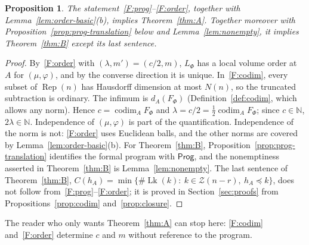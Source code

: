 \documentclass[11pt,a4paper]{article}
\newtheorem{proposition}[theorem]{Proposition}
\theoremstyle{definition}
\theoremstyle{remark}
\numberwithin{equation}{section}
\newcommand{\N}{\mathbb{N}}
\newcommand{\Rep}{\operatorname{Rep}}
\newcommand{\codim}{\operatorname{codim}}
\newcommand{\Zb}{\mathcal Z}
\newcommand{\Prog}{\mathsf{Prog}}
\newcommand{\Lk}{\operatorname{Lk}}
\begin{document}
\begin{proposition}\label{prop:formal-implies}
The statement~\ref{F:prog}--\ref{F:order}, together with Lemma~\ref{lem:order-basic}(b), implies Theorem~\ref{thm:A}. Together moreover with Proposition~\ref{prop:prog-translation} below and Lemma~\ref{lem:nonempty}, it implies Theorem~\ref{thm:B} except its last sentence.
\end{proposition}
\begin{proof}
By~\ref{F:order} with $(\lambda,m')=(c/2,m)$, $L_\Phi$ has a local volume order at $A$ for $(\mu,\varphi)$, and by the converse direction it is unique. In~\ref{F:codim}, every subset of $\Rep(n)$ has Hausdorff dimension at most $N(n)$, so the truncated subtraction is ordinary. The infimum is $d_A(F_\Phi)$ (Definition~\ref{def:codim}, which allows any norm). Hence $c=\codim_AF_\Phi$ and $\lambda=c/2=\frac{1}{2}\codim_AF_\Phi$; since $c\in\N$, $2\lambda\in\N$. Independence of $(\mu,\varphi)$ is part of the quantification. Independence of the norm is not: \ref{F:order} uses Euclidean balls, and the other norms are covered by Lemma~\ref{lem:order-basic}(b). For Theorem~\ref{thm:B}, Proposition~\ref{prop:prog-translation} identifies the formal program with $\Prog$, and the nonemptiness asserted in Theorem~\ref{thm:B} is Lemma~\ref{lem:nonempty}. The last sentence of Theorem~\ref{thm:B}, $C(h_A)=\min\{\#\Lk(k):\ k\in\Zb(n-r),\ h_A\preceq k\}$, does not follow from~\ref{F:prog}--\ref{F:order}; it is proved in Section~\ref{sec:proofs} from Propositions~\ref{prop:codim} and~\ref{prop:closure}.
\end{proof}

The reader who only wants Theorem~\ref{thm:A} can stop here: \ref{F:codim} and~\ref{F:order} determine $c$ and $m$ without reference to the program.
\end{document}
